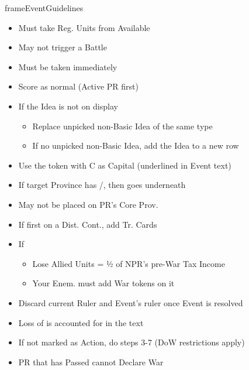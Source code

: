 \documentclass[10pt]{article}
\begin{document}
\begin{dynamiccontents*}{frameEventGuidelines}
\begin{multicols}{2}
\begin{itemize}
			\item Must take Reg. Units from Available \manpower
			\item May not trigger a Battle
		\end{itemize}
		\begin{itemize}
			\item Must be taken immediately
		\end{itemize}
		\begin{itemize}
			\item Score \prestige as normal (Active PR first)
			\item If the Idea is not on display
			\begin{itemize}
				\item Replace unpicked non-Basic Idea of the same type
				\item If no unpicked non-Basic Idea, add the Idea to a new row
			\end{itemize}
		\end{itemize}
		\begin{itemize}
			\item Use the token with C as Capital (underlined in Event text)
			\item If target Province has \town/\vassal, then \dnpr goes underneath
			\item May not be placed on PR's Core Prov.
			\item If first \dnpr on a Dist. Cont., add Tr. Cards
		\end{itemize}
		\begin{itemize}
			\item If \activeally
			\begin{itemize}
				\item Lose Allied Units = ½ of NPR's pre-War Tax Income
				\item Your Enem. must add War tokens on it
			\end{itemize}
		\end{itemize}
		\begin{itemize}
			\item Discard current Ruler and Event's ruler once Event is resolved
		\end{itemize}
		\begin{itemize}
			\item Loss of \authority is accounted for in the text
		\end{itemize}
		\begin{itemize}
			\item If not marked as  Action, do steps 3-7 (DoW restrictions apply)
			\item PR that has Passed cannot Declare War
		\end{itemize}
	\end{multicols}
\end{dynamiccontents*}
\end{document}
